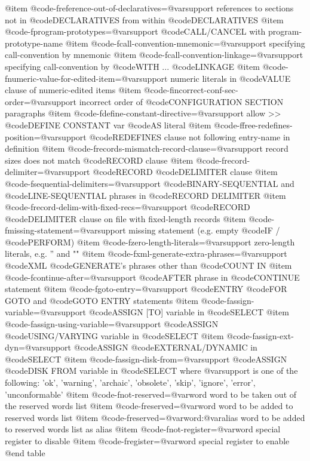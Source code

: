 @item @code{-freference-out-of-declaratives=@var{support}}
references to sections not in @code{DECLARATIVES} from within @code{DECLARATIVES}
@item @code{-fprogram-prototypes=@var{support}}
@code{CALL}/CANCEL with program-prototype-name
@item @code{-fcall-convention-mnemonic=@var{support}}
specifying call-convention by mnemonic
@item @code{-fcall-convention-linkage=@var{support}}
specifying call-convention by @code{WITH} ... @code{LINKAGE}
@item @code{-fnumeric-value-for-edited-item=@var{support}}
numeric literals in @code{VALUE} clause of numeric-edited items
@item @code{-fincorrect-conf-sec-order=@var{support}}
incorrect order of @code{CONFIGURATION SECTION} paragraphs
@item @code{-fdefine-constant-directive=@var{support}}
allow >> @code{DEFINE CONSTANT} var @code{AS} literal
@item @code{-ffree-redefines-position=@var{support}}
@code{REDEFINES} clause not following entry-name in definition
@item @code{-frecords-mismatch-record-clause=@var{support}}
record sizes does not match @code{RECORD} clause
@item @code{-frecord-delimiter=@var{support}}
@code{RECORD} @code{DELIMITER} clause
@item @code{-fsequential-delimiters=@var{support}}
@code{BINARY-SEQUENTIAL} and @code{LINE-SEQUENTIAL} phrases in @code{RECORD DELIMITER}
@item @code{-frecord-delim-with-fixed-recs=@var{support}}
@code{RECORD} @code{DELIMITER} clause on file with fixed-length records
@item @code{-fmissing-statement=@var{support}}
missing statement (e.g. empty @code{IF} / @code{PERFORM})
@item @code{-fzero-length-literals=@var{support}}
zero-length literals, e.g. '' and ""
@item @code{-fxml-generate-extra-phrases=@var{support}}
@code{XML} @code{GENERATE}'s phrases other than @code{COUNT IN}
@item @code{-fcontinue-after=@var{support}}
@code{AFTER} phrase in @code{CONTINUE} statement
@item @code{-fgoto-entry=@var{support}}
@code{ENTRY} @code{FOR GOTO} and @code{GOTO ENTRY} statements
@item @code{-fassign-variable=@var{support}}
@code{ASSIGN} [TO] variable in @code{SELECT}
@item @code{-fassign-using-variable=@var{support}}
@code{ASSIGN} @code{USING}/VARYING variable in @code{SELECT}
@item @code{-fassign-ext-dyn=@var{support}}
@code{ASSIGN} @code{EXTERNAL}/DYNAMIC in @code{SELECT}
@item @code{-fassign-disk-from=@var{support}}
@code{ASSIGN} @code{DISK FROM} variable in @code{SELECT}
where @var{support} is one of the following:
'ok', 'warning', 'archaic', 'obsolete', 'skip', 'ignore', 'error', 'unconformable'
@item @code{-fnot-reserved=@var{word}}
word to be taken out of the reserved words list
@item @code{-freserved=@var{word}}
word to be added to reserved words list
@item @code{-freserved=@var{word}:@var{alias}}
word to be added to reserved words list as alias
@item @code{-fnot-register=@var{word}}
special register to disable
@item @code{-fregister=@var{word}}
special register to enable
@end table
